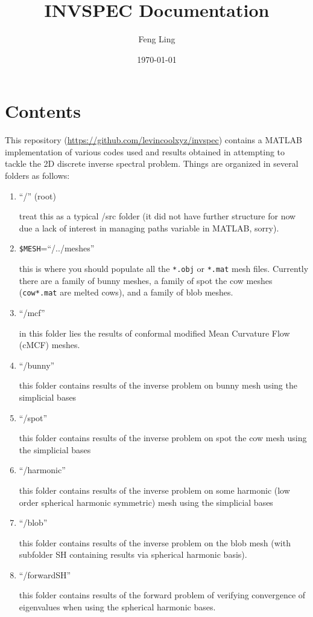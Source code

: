 \documentclass[11pt]{article}
\title{INVSPEC Documentation}
\author{Feng Ling}
\date{\monthyear\today}
\theoremstyle{definition}
\begin{document}
\maketitle
\thispagestyle{empty}

\section{Contents}
This repository (\url{https://github.com/levincoolxyz/invspec}) contains a MATLAB implementation of various codes used and results obtained in attempting to tackle the 2D discrete inverse spectral problem. Things are organized in several folders as follows:

\begin{enumerate}
	\item ``/'' (root)
	
	  treat this as a typical /src folder (it did not have further structure for now due a lack of interest in managing paths variable in MATLAB, sorry).
	  
	\item \verb|$MESH|=``/../meshes''
	
	  this is where you should populate all the \verb|*.obj| or \verb|*.mat| mesh files. 
	  Currently there are a family of bunny meshes, a family of spot the cow meshes (\verb|cow*.mat| are melted cows), and a family of blob meshes.
	  
	\item ``/mcf''
	
	  in this folder lies the results of conformal modified Mean Curvature Flow (cMCF) meshes.
	  
	\item ``/bunny''
	
	this folder contains results of the inverse problem on bunny mesh using the simplicial bases
	
	\item ``/spot''
	
	this folder contains results of the inverse problem on spot the cow mesh using the simplicial bases
	
	\item ``/harmonic''
	
	this folder contains results of the inverse problem on some harmonic (low order spherical harmonic symmetric) mesh using the simplicial bases
	
	\item ``/blob''
	
	this folder contains results of the inverse problem on the blob mesh (with subfolder SH containing results via spherical harmonic basis).
	
	\item ``/forwardSH''
	
	this folder contains results of the forward problem of verifying convergence of eigenvalues when using the spherical harmonic bases.
\end{enumerate}
\end{document}
